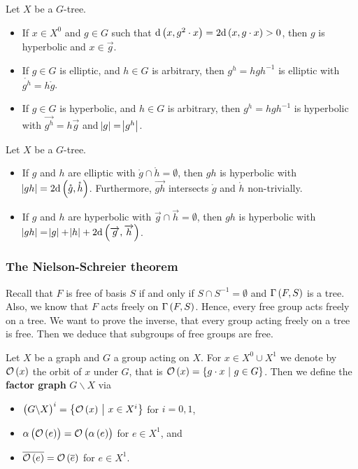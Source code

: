 \begin{exercise}
Let $ X $ be a $ G $-tree.
\begin{itemize}
\item If $ x \in X^0 $ and $ g \in G $ such that $ \d\br{x, g^2 \cdot x} = 2\d\br{x, g \cdot x} > 0 $, then $ g $ is hyperbolic and $ x \in \overrightarrow{g} $.
\item If $ g \in G $ is elliptic, and $ h \in G $ is arbitrary, then $ g^h = hgh^{-1} $ is elliptic with $ \mathring{g^h} = h\mathring{g} $.
\item If $ g \in G $ is hyperbolic, and $ h \in G $ is arbitrary, then $ g^h = hgh^{-1} $ is hyperbolic with $ \overrightarrow{g^h} = h\overrightarrow{g} $ and $ \abs{g} = \abs{g^h} $.
\end{itemize}
\end{exercise}

\begin{proposition}
Let $ X $ be a $ G $-tree.
\begin{itemize}
\item If $ g $ and $ h $ are elliptic with $ \mathring{g} \cap \mathring{h} = \emptyset $, then $ gh $ is hyperbolic with $ \abs{gh} = 2\d\br{\mathring{g}, \mathring{h}} $. Furthermore, $ \overrightarrow{gh} $ intersects $ \mathring{g} $ and $ \mathring{h} $ non-trivially.
\item If $ g $ and $ h $ are hyperbolic with $ \overrightarrow{g} \cap \overrightarrow{h} = \emptyset $, then $ gh $ is hyperbolic with $ \abs{gh} = \abs{g} + \abs{h} + 2\d\br{\overrightarrow{g}, \overrightarrow{h}} $.
\end{itemize}
\end{proposition}

\subsubsection{The Nielson-Schreier theorem}

Recall that $ F $ is free of basis $ S $ if and only if $ S \cap S^{-1} = \emptyset $ and $ \Gamma\br{F, S} $ is a tree. Also, we know that $ F $ acts freely on $ \Gamma\br{F, S} $. Hence, every free group acts freely on a tree. We want to prove the inverse, that every group acting freely on a tree is free. Then we deduce that subgroups of free groups are free.

\begin{definition}
Let $ X $ be a graph and $ G $ a group acting on $ X $. For $ x \in X^0 \cup X^1 $ we denote by $ \OOO\br{x} $ the orbit of $ x $ under $ G $, that is $ \OOO\br{x} = \cbr{g \cdot x \st g \in G} $. Then we define the \textbf{factor graph} $ G \backslash X $ via
\begin{itemize}
\item $ \br{G \backslash X}^i = \cbr{\OOO\br{x} \st x \in X^i} $ for $ i = 0, 1 $,
\item $ \alpha\br{\OOO\br{e}} = \OOO\br{\alpha\br{e}} $ for $ e \in X^1 $, and
\item $ \overline{\OOO\br{e}} = \OOO\br{\overline{e}} $ for $ e \in X^1 $.
\end{itemize}
\end{definition}

